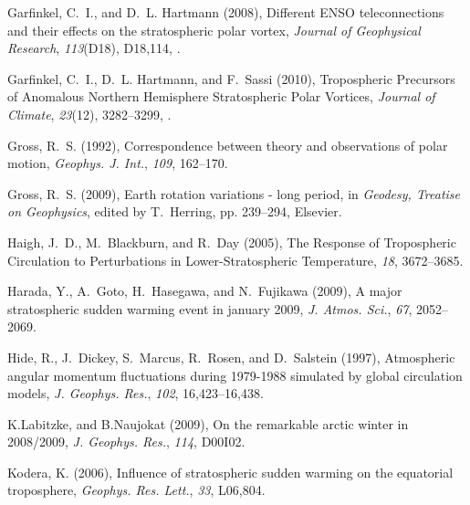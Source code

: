 \documentclass[draft,jgrga]{agutex}
\begin{document}
\begin{article}
\begin{thebibliography}{38}
Garfinkel, C.~I., and D.~L. Hartmann (2008), {Different ENSO teleconnections
  and their effects on the stratospheric polar vortex}, \textit{Journal of
  Geophysical Research}, \textit{113}(D18), D18,114,
  .

Garfinkel, C.~I., D.~L. Hartmann, and F.~Sassi (2010), {Tropospheric Precursors
  of Anomalous Northern Hemisphere Stratospheric Polar Vortices},
  \textit{Journal of Climate}, \textit{23}(12), 3282--3299,
  .

Gross, R.~S. (1992), Correspondence between theory and observations of polar
  motion, \textit{Geophys. J. Int.}, \textit{109}, 162--170.

Gross, R.~S. (2009), Earth rotation variations - long period, in
  \textit{Geodesy, Treatise on Geophysics}, edited by T.~Herring, pp. 239--294,
  Elsevier.

Haigh, J.~D., M.~Blackburn, and R.~Day (2005), {The Response of Tropospheric
  Circulation to Perturbations in Lower-Stratospheric Temperature},
  \textit{18}, 3672--3685.

Harada, Y., A.~Goto, H.~Hasegawa, and N.~Fujikawa (2009), A major stratospheric
  sudden warming event in january 2009, \textit{J. Atmos. Sci.}, \textit{67},
  2052--2069.

Hide, R., J.~Dickey, S.~Marcus, R.~Rosen, and D.~Salstein (1997), Atmospheric
  angular momentum fluctuations during 1979-1988 simulated by global
  circulation models, \textit{J. Geophys. Res.}, \textit{102}, 16,423--16,438.

K.Labitzke, and B.Naujokat (2009), On the remarkable arctic winter in
  2008/2009, \textit{J. Geophys. Res.}, \textit{114}, D00I02.

Kodera, K. (2006), Influence of stratospheric sudden warming on the equatorial
  troposphere, \textit{Geophys. Res. Lett.}, \textit{33}, L06,804.


\end{thebibliography}
\end{article}
\end{document}
